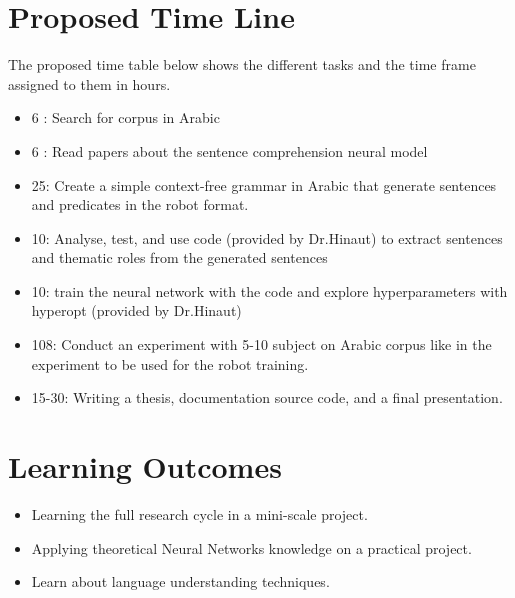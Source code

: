 \documentclass[paper=a4, fontsize=11pt]{scrartcl} %
\numberwithin{equation}{section} %
\numberwithin{figure}{section} %
\numberwithin{table}{section} %
\begin{document}
\section{Proposed Time Line}
The proposed time table below shows the different tasks and the time frame assigned to them in hours.
\begin{itemize}
\item 6 : Search for corpus in Arabic
\item 6 : Read papers about the sentence comprehension neural model
\item 25: Create a simple context-free grammar in Arabic that generate sentences and predicates in the robot format.
\item 10: Analyse, test, and use code (provided by Dr.Hinaut) to extract sentences and thematic roles from the generated sentences
\item 10: train the neural network with the code and explore hyperparameters with hyperopt (provided by Dr.Hinaut)
\item 108: Conduct an experiment with 5-10 subject on Arabic corpus like in the experiment \cite{Hinaut2014} to be used for the robot training.
\item 15-30: Writing a thesis, documentation source code, and a final presentation.
\end{itemize}


\section{Learning Outcomes}
\begin{itemize}
\item Learning the full research cycle in a mini-scale project.
\item Applying theoretical Neural Networks knowledge on a practical project.
\item Learn about language understanding techniques.
\end{itemize}




\end{document}
